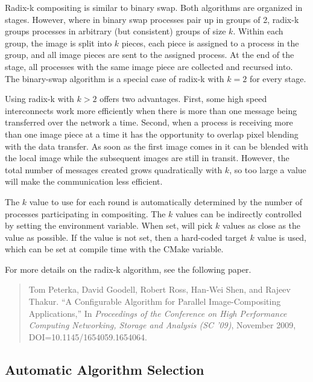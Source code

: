 Radix-k compositing is similar to binary swap.  Both algorithms are
organized in stages.  However, where in binary swap processes pair up in
groups of 2, radix-k groups processes in arbitrary (but consistent) groups
of size $k$.  Within each group, the image is split into $k$ pieces, each
piece is assigned to a process in the group, and all image pieces are sent
to the assigned process.  At the end of the stage, all processes with the
same image piece are collected and recursed into.  The binary-swap
algorithm is a special case of radix-k with $k=2$ for every stage.

Using radix-k with $k>2$ offers two advantages.  First, some high speed
interconnects work more efficiently when there is more than one message
being transferred over the network a time.  Second, when a process is
receiving more than one image piece at a time it has the opportunity to
overlap pixel blending with the data transfer.  As soon as the first image
comes in it can be blended with the local image while the subsequent images
are still in transit.  However, the total number of messages created grows
quadratically with $k$, so too large a value will make the communication
less efficient.

The $k$ value to use for each round is automatically determined by the
number of processes participating in compositing.  The $k$ values can be
indirectly controlled by setting the  environment
variable.  When set, \IceT will pick $k$ values as close as the
 value as possible.  If the 
value is not set, then a hard-coded target $k$ value is used, which can be
set at compile time with the  CMake
variable.

For more details on the radix-k algorithm, see the following paper.

\begin{quote}
  Tom Peterka, David Goodell, Robert Ross, Han-Wei Shen, and Rajeev Thakur.
  ``A Configurable Algorithm for Parallel Image-Compositing Applications,''
  In \emph{Proceedings of the Conference on High Performance Computing
    Networking, Storage and Analysis (SC '09)}, November 2009,
  DOI=10.1145/1654059.1654064.
\end{quote}


\subsection{Automatic Algorithm Selection}

